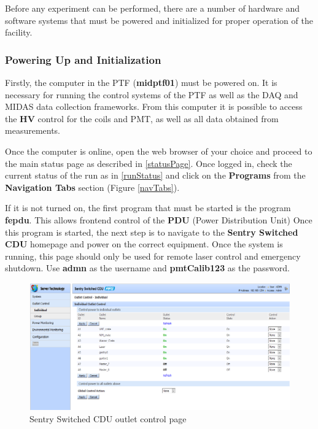 \documentclass[twoside,letterpaper]{refart}
\begin{document}
Before any experiment can be performed, there are a number of hardware and software systems that must be powered and initialized for proper operation of the facility. 

\subsubsection{Powering Up and Initialization}

Firstly, the computer in the PTF (\textbf{midptf01}) must be powered on.  It is necessary for running the control systems of the PTF as well as the DAQ and MIDAS data collection frameworks.  From this computer it is possible to access the \textbf{HV} control for the coils and PMT, as well as all data obtained from measurements. 

Once the computer is online, open the web browser of your choice and proceed to the main status page as described in \ref{statusPage}. Once logged in, check the current status of the run as in \ref{runStatus} and click on the \textbf{Programs} from the \textbf{Navigation Tabs} section (Figure \ref{navTabs}).

If it is not turned on, the first program that must be started is the program \textbf{fepdu}. This allows frontend control of the \textbf{PDU} (Power Distribution Unit) Once this program is started, the next step is to navigate to the \textbf{Sentry Switched CDU} homepage and power on the correct equipment. Once the system is running, this page should only be used for remote laser control and emergency shutdown. Use \textbf{admn} as the username and \textbf{pmtCalib123} as the password.

\begin{figure}[!htpb]
	\centering
	\includegraphics[scale=0.25]{images/sentrySwitchedCDU.png}
	\caption{Sentry Switched CDU outlet control page}
	\label{cdu}
\end{figure}
\end{document}
